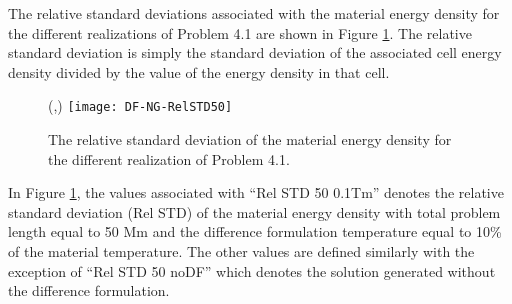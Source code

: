 	The relative standard deviations associated with the material energy density for the different realizations of Problem 4.1 are shown in Figure \ref{fig:DF-NG-RelSTD50}. The relative standard deviation is simply the standard deviation of the associated cell energy density divided by the value of the energy density in that cell. 

\begin{figure}[htbp]
	\begin{center}
		\begin{minipage}[t]{6in}
		\centering
		\begin{picture}(\width,\height)
	                {\texttt{[image: DF-NG-RelSTD50]}}
		\end{picture}
		\caption{\label{fig:DF-NG-RelSTD50} The relative standard deviation of the material energy density for the different realization of Problem 4.1.}
		\end{minipage} %
	\end{center}
\end{figure}

	In Figure \ref{fig:DF-NG-RelSTD50}, the values associated with ``Rel STD 50 0.1Tm'' denotes the relative standard deviation (Rel STD) of the material energy density with total problem length equal to 50 Mm and the difference formulation temperature equal to 10\% of the material temperature. The other values are defined similarly with the exception of ``Rel STD 50 noDF'' which denotes the solution generated without the difference formulation. 

